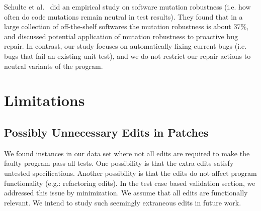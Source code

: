 \documentclass[sigconf, timestamp-false, anonymous=true]{acmart}
\begin{document}
Schulte et al.~\cite{schulte} did an empirical study on software mutation robustness 
(i.e. how often do code mutations remain neutral in test results). 
They found that in a large collection of off-the-shelf softwares the mutation robustness is about 37\%, 
and discussed potential application of mutation robustness to proactive bug repair. 
In contrast, our study focuses on automatically fixing current bugs (i.e. bugs that fail an existing unit test), 
and we do not restrict our repair actions to neutral variants of the program.

\section{Limitations}

\subsection{Possibly Unnecessary Edits in Patches}

We found instances in our data set where not all edits are required to 
make the faulty program pass all tests. One possibility is that the extra 
edits satisfy untested specifications. Another possibility is that the edits 
do not affect program functionality (e.g.: refactoring edits). In the test case based
validation section, we addressed this issue by minimization. We assume 
that all edits are functionally relevant. We intend to study such seemingly
extraneous edits in future work.



\end{document}
